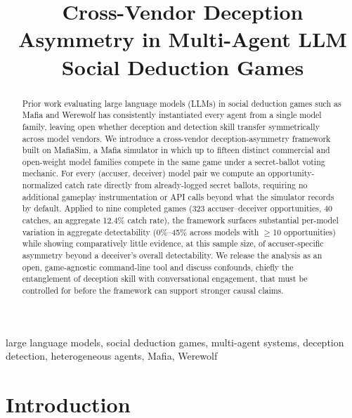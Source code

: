 \documentclass[10pt,conference]{IEEEtran}
\begin{document}
\title{Cross-Vendor Deception Asymmetry in Multi-Agent LLM Social Deduction Games}

\author{
}

\maketitle

\begin{abstract}
Prior work evaluating large language models (LLMs) in social deduction games such as Mafia and Werewolf has consistently instantiated every agent from a single model family, leaving open whether deception and detection skill transfer symmetrically across model vendors. We introduce a cross-vendor deception-asymmetry framework built on MafiaSim, a Mafia simulator in which up to fifteen distinct commercial and open-weight model families compete in the same game under a secret-ballot voting mechanic. For every (accuser, deceiver) model pair we compute an opportunity-normalized catch rate directly from already-logged secret ballots, requiring no additional gameplay instrumentation or API calls beyond what the simulator records by default. Applied to nine completed games (323 accuser--deceiver opportunities, 40 catches, an aggregate 12.4\% catch rate), the framework surfaces substantial per-model variation in aggregate detectability (0\%--45\% across models with $\geq$10 opportunities) while showing comparatively little evidence, at this sample size, of accuser-specific asymmetry beyond a deceiver's overall detectability. We release the analysis as an open, game-agnostic command-line tool and discuss confounds, chiefly the entanglement of deception skill with conversational engagement, that must be controlled for before the framework can support stronger causal claims.
\end{abstract}

\begin{IEEEkeywords}
large language models, social deduction games, multi-agent systems, deception detection, heterogeneous agents, Mafia, Werewolf
\end{IEEEkeywords}

\section{Introduction}
\end{document}
